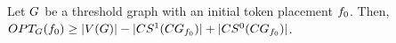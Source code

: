 \documentclass[msc,english,table,xcdraw]{ppgccufmg}
\begin{document}
    
    
    

\begin{lemma}
\label{lem:lb_threshold}
Let $G$ be a threshold graph with an initial token placement $f_{0}$.
Then, $OPT_{G}(f_{0}) \geq |V(G)| - 
|CS^{1}(CG_{f_{0}})| +
|CS^{0}(CG_{f_{0}})|$.
\end{lemma}
\end{document}
